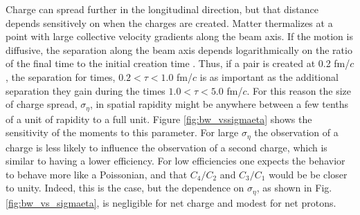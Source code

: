 Charge can spread further in the longitudinal direction, but that distance depends sensitively on when the charges are created. Matter thermalizes at a point with large collective velocity gradients along the beam axis. If the motion is diffusive, the separation along the beam axis depends logarithmically on the ratio of the final time to the initial creation time \cite{Bass:2000az}.  Thus, if a pair is created at 0.2 fm/$c$, the separation for times, $0.2<\tau<1.0$ fm/$c$ is as important as the additional separation they gain during the times $1.0<\tau<5.0$ fm/$c$. For this reason the size of charge spread, $\sigma_\eta$, in spatial rapidity might be anywhere between a few tenths of a unit of rapidity to a full unit. Figure \ref{fig:bw_vssigmaeta} shows the sensitivity of the moments to this parameter. For large $\sigma_\eta$ the observation of a charge is less likely to influence the observation of a second charge, which is similar to having a lower efficiency. For low efficiencies one expects the behavior to behave more like a Poissonian, and that $C_4/C_2$ and $C_3/C_1$ would be be closer to unity. Indeed, this is the case, but the dependence on $\sigma_\eta$, as shown in Fig. \ref{fig:bw_vs_sigmaeta}, is negligible for net charge and modest for net protons.
